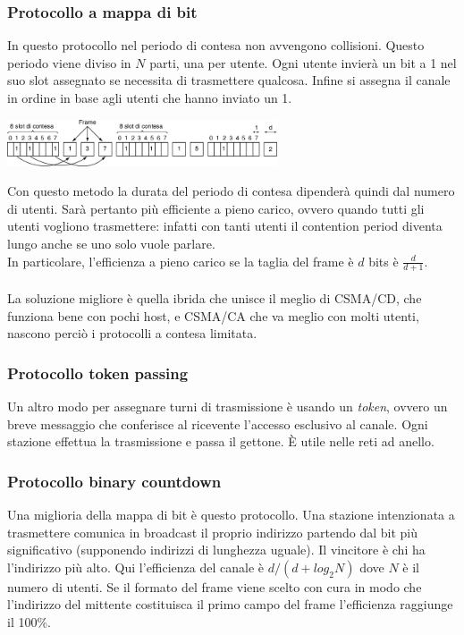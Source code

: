 \documentclass[10pt,a4paper,twoside]{article}
\begin{document}
\subsubsection{Protocollo a mappa di bit}
In questo protocollo nel periodo di contesa non avvengono collisioni. Questo periodo viene diviso in $N$ parti, una per utente. Ogni utente invierà un bit a 1 nel suo slot assegnato se necessita di trasmettere qualcosa. Infine si assegna il canale in ordine in base agli utenti che hanno inviato un 1.
\begin{center}
\includegraphics[width=0.6\textwidth]{images/mappabit.png}
\end{center}
Con questo metodo la durata del periodo di contesa dipenderà quindi dal numero di utenti. Sarà pertanto più efficiente a pieno carico, ovvero quando tutti gli utenti vogliono trasmettere: infatti con tanti utenti il contention period diventa lungo anche se uno solo vuole parlare.\\
In particolare, l'efficienza a pieno carico se la taglia del frame è $d$ bits è $\frac{d}{d+1}$.\\\\
La soluzione migliore è quella ibrida che unisce il meglio di CSMA/CD, che funziona bene con pochi host, e CSMA/CA che va meglio con molti utenti, nascono perciò i protocolli a contesa limitata.

\subsubsection{Protocollo token passing}
Un altro modo per assegnare turni di trasmissione è usando un \textit{token}, ovvero un breve messaggio che conferisce al ricevente l'accesso esclusivo al canale. Ogni stazione effettua la trasmissione e passa il gettone. È utile nelle reti ad anello.

\subsubsection{Protocollo binary countdown}
Una miglioria della mappa di bit è questo protocollo. Una stazione intenzionata a trasmettere comunica in broadcast il proprio indirizzo partendo dal bit più significativo (supponendo indirizzi di lunghezza uguale). Il vincitore è chi ha l'indirizzo più alto. Qui l'efficienza del canale è $d/(d+log_2N)$ dove $N$ è il numero di utenti. Se il formato del frame viene scelto con cura in modo che l'indirizzo del mittente costituisca il primo campo del frame l'efficienza raggiunge il 100\%.
\end{document}
